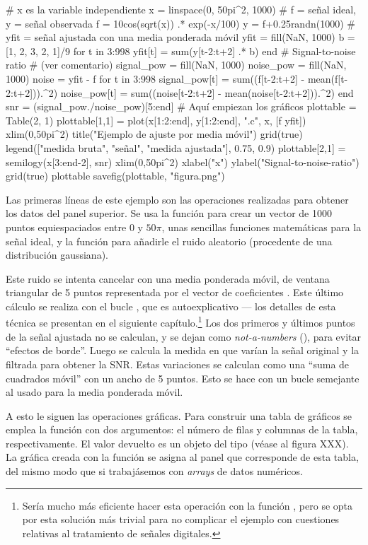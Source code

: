 ﻿\documentclass[spanish]{article}
\begin{document}
# x es la variable independiente
x = linspace(0, 50pi^2, 1000)
# f = señal ideal, y = señal observada
f = 10cos(sqrt(x)) .* exp(-x/100)
y = f+0.25randn(1000)
# yfit = señal ajustada con una media ponderada móvil
yfit = fill(NaN, 1000)
b = [1, 2, 3, 2, 1]/9
for t in 3:998
  yfit[t] = sum(y[t-2:t+2] .* b)
end
# Signal-to-noise ratio
# (ver comentario)
signal_pow = fill(NaN, 1000)
noise_pow = fill(NaN, 1000)
noise = yfit - f
for t in 3:998
  signal_pow[t] = sum((f[t-2:t+2] - mean(f[t-2:t+2])).^2)
  noise_pow[t] = sum((noise[t-2:t+2] - mean(noise[t-2:t+2])).^2)
end
snr = (signal_pow./noise_pow)[5:end]
# Aquí empiezan los gráficos
plottable = Table(2, 1)
plottable[1,1] = plot(x[1:2:end], y[1:2:end], ".c", x, [f yfit])
xlim(0,50pi^2)
title("Ejemplo de ajuste por media móvil")
grid(true)
legend(["medida bruta", "señal", "medida ajustada"], 0.75, 0.9)
plottable[2,1] = semilogy(x[3:end-2], snr)
xlim(0,50pi^2)
xlabel("x")
ylabel("Signal-to-noise-ratio")
grid(true)
plottable
savefig(plottable, "figura.png")

Las primeras líneas de este ejemplo son las operaciones realizadas
para obtener los datos del panel superior. Se usa la función 
para crear un vector de 1000 puntos equiespaciados entre $0$ y $50\pi$,
unas sencillas funciones matemáticas para la señal ideal, y la función
 para añadirle el ruido aleatorio (procedente de una distribución
gaussiana).

Este ruido se intenta cancelar con una media ponderada móvil, de
ventana triangular de 5 puntos representada por el vector de coeficientes
. Este último cálculo se realiza con el bucle , que
es autoexplicativo --- los detalles de esta técnica se presentan en  el
siguiente capítulo.\footnote{%
Sería mucho más eficiente hacer esta operación con la
función , pero se opta por esta solución más trivial para no
complicar el ejemplo con cuestiones relativas al tratamiento de señales digitales.}%
Los dos primeros y últimos puntos de la señal ajustada no se calculan, y se
dejan como \emph{not-a-numbers} (), para evitar ``efectos de borde''.
Luego se calcula la medida en que varían la señal original y la filtrada para obtener la
SNR. Estas variaciones se calculan como una
``suma de cuadrados móvil'' con un ancho de 5 puntos. Esto se hace con un bucle
semejante al usado para la media ponderada móvil.

A esto le siguen las operaciones gráficas. Para construir una tabla de gráficos se
emplea la función  con dos argumentos: el número de filas y
columnas de la tabla, respectivamente. El valor devuelto es un objeto del tipo
 (véase al figura XXX).
La gráfica creada con la función 
se asigna al panel que corresponde de esta tabla, del mismo modo que si
trabajásemos con \emph{arrays} de datos numéricos.
\end{document}
